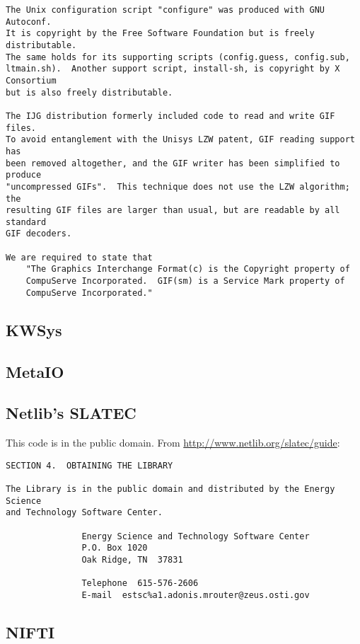 \begin{verbatim}
The Unix configuration script "configure" was produced with GNU Autoconf.
It is copyright by the Free Software Foundation but is freely distributable.
The same holds for its supporting scripts (config.guess, config.sub,
ltmain.sh).  Another support script, install-sh, is copyright by X Consortium
but is also freely distributable.

The IJG distribution formerly included code to read and write GIF files.
To avoid entanglement with the Unisys LZW patent, GIF reading support has
been removed altogether, and the GIF writer has been simplified to produce
"uncompressed GIFs".  This technique does not use the LZW algorithm; the
resulting GIF files are larger than usual, but are readable by all standard
GIF decoders.

We are required to state that
    "The Graphics Interchange Format(c) is the Copyright property of
    CompuServe Incorporated.  GIF(sm) is a Service Mark property of
    CompuServe Incorporated."
\end{verbatim}

\subsection{KWSys}


\subsection{MetaIO}


\subsection{Netlib's SLATEC}
This code is in the public domain.  From
\url{http://www.netlib.org/slatec/guide}:
\begin{verbatim}
SECTION 4.  OBTAINING THE LIBRARY

The Library is in the public domain and distributed by the Energy Science
and Technology Software Center.

               Energy Science and Technology Software Center
               P.O. Box 1020
               Oak Ridge, TN  37831

               Telephone  615-576-2606
               E-mail  estsc%a1.adonis.mrouter@zeus.osti.gov
\end{verbatim}

\subsection{NIFTI}


